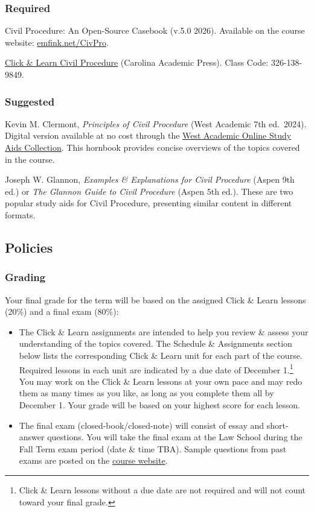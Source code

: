 \documentclass[11pt,letterpaper,twoside]{article}
\providecommand{\tightlist}{%
\setlength{\itemsep}{0em}\setlength{\parskip}{0em}\setlength{\itemindent}{0em}}
\begin{document}
\subsubsection{Required}\label{required}

Civil Procedure: An Open-Source Casebook (v.5.0 2026). Available on the
course website:
{\href{https://www.emfink.net/CivPro/}{emfink.net/CivPro}}.

\href{https://clickandlearnguide.com}{Click \& Learn Civil Procedure}
(Carolina Academic Press). Class Code: 326-138-9849.

\subsubsection{Suggested}\label{suggested}

Kevin M. Clermont, \emph{Principles of Civil Procedure} (West Academic
7th ed.~2024). Digital version available at no cost through the
\href{https://subscription.westacademic.com/}{West Academic Online Study
Aids Collection}. This hornbook provides concise overviews of the topics
covered in the course.

Joseph W. Glannon, \emph{Examples \& Explanations for Civil Procedure}
(Aspen 9th ed.) or \emph{The Glannon Guide to Civil Procedure} (Aspen
5th ed.). These are two popular study aids for Civil Procedure,
presenting similar content in different formats.

\subsection*{Policies}\label{policies}

\subsubsection{Grading}\label{grading}

Your final grade for the term will be based on the assigned Click \&
Learn lessons (20\%) and a final exam (80\%):

\begin{itemize}
\tightlist
\item
  The Click \& Learn assignments are intended to help you review \&
  assess your understanding of the topics covered. The Schedule \&
  Assignments section below lists the corresponding Click \& Learn unit
  for each part of the course. Required lessons in each unit are
  indicated by a due date of December 1.\footnote{Click \& Learn lessons
    without a due date are not required and will not count toward your
    final grade.} You may work on the Click \& Learn lessons at your own
  pace and may redo them as many times as you like, as long as you
  complete them all by December 1. Your grade will be based on your
  highest score for each lesson.
\item
  The final exam (closed-book/closed-note) will consist of essay and
  short-answer questions. You will take the final exam at the Law School
  during the Fall Term exam period (date \& time TBA). Sample questions
  from past exams are posted on the
  \href{https://www.emfink.net/CivPro/}{course website}.
\end{itemize}
\end{document}
